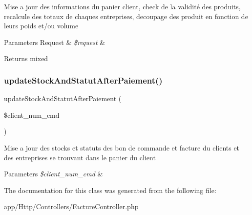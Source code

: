Mise a jour des informations du panier client, check de la validité des produits, recalcule des totaux de chaques entreprises, decoupage des produit en fonction de leurs poids et/ou volume 
\begin{DoxyParams}[1]{Parameters}
Request & {\em \$request} & \\
\hline
\end{DoxyParams}
\begin{DoxyReturn}{Returns}
mixed 
\end{DoxyReturn}
\mbox{\label{class_app_1_1_http_1_1_controllers_1_1_facture_controller_a7fa9af1e7f6f2878bef120c82ed27e6a}} 
\subsubsection{\texorpdfstring{update\+Stock\+And\+Statut\+After\+Paiement()}{updateStockAndStatutAfterPaiement()}}
{\footnotesize\ttfamily update\+Stock\+And\+Statut\+After\+Paiement (\begin{DoxyParamCaption}\item[{}]{\$client\+\_\+num\+\_\+cmd }\end{DoxyParamCaption})}

Mise a jour des stocks et statuts des bon de commande et facture du clients et des entreprises se trouvant dans le panier du client 
\begin{DoxyParams}{Parameters}
{\em \$client\+\_\+num\+\_\+cmd} & \\
\hline
\end{DoxyParams}


The documentation for this class was generated from the following file\+:\begin{DoxyCompactItemize}
\item 
app/\+Http/\+Controllers/Facture\+Controller.\+php\end{DoxyCompactItemize}
